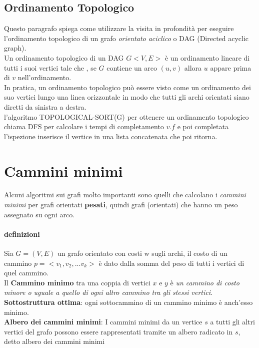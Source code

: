 \documentclass[12pt, a4paper, openany]{book}
\begin{document}

\subsection*{Ordinamento Topologico}
Questo paragrafo spiega come utilizzare la visita in profondità per eseguire l'ordinamento topologico di un
grafo \emph{orientato aciclico} o DAG (Directed acyclic graph).
\\Un ordinamento topologico di un DAG $G<V,E>$ è un ordinamento lineare di tutti i suoi vertici tale che , se $G$ contiene un arco $(u,v)$
allora $u$ appare prima di $v$ nell'ordinamento.
\\In pratica, un ordinamento topologico può essere visto come un ordinamento dei suo vertici lungo una linea orizzontale in modo che tutti gli archi orientati siano diretti da sinistra a destra.
\\l'algoritmo TOPOLOGICAL-SORT(G) per ottenere un ordinamento topologico chiama DFS per calcolare i tempi di completamento $v.f$ e poi completata l'ispezione inserisce il vertice in una lista concatenata che poi ritorna.


\section{Cammini minimi}
Alcuni algoritmi sui grafi molto importanti sono quelli che calcolano i \emph{cammini minimi} per grafi orientati \textbf{pesati},
quindi grafi (orientati) che hanno un peso assegnato su ogni arco.

\paragraph*{definizioni}
Sia $G=(V,E)$ un grafo orientato con costi w sugli archi,
il costo di un cammino $p=<v_1,v_2,...v_k>$ è dato dalla somma del peso di tutti i vertici di quel cammino.
\\Il \textbf{Cammino minimo} tra una coppia di vertici $x$ e $y$ è \emph{un cammino di costo
	minore o uguale a quello di ogni altro cammino tra gli stessi vertici}.
\\\textbf{Sottostruttura ottima}: ogni sottocammino di un cammino minimo è anch'esso minimo.
\\\textbf{Albero dei cammini minimi}: I cammini minimi da un vertice $s$ a tutti gli altri vertici del grafo possono
essere rappresentati tramite un albero radicato in $s$, detto albero dei cammini minimi
\end{document}

